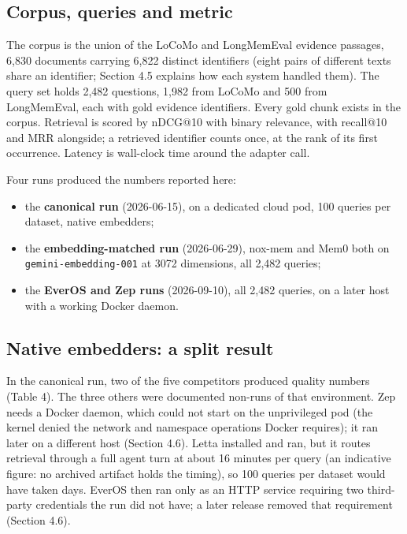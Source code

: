\documentclass[a4paper,fleqn]{cas-sc}
\providecommand{\tightlist}{\setlength{\itemsep}{0pt}\setlength{\parskip}{0pt}}
\begin{document}
\subsection{Corpus, queries and metric}

The corpus is the union of the LoCoMo and LongMemEval evidence passages, 6,830 documents carrying 6,822 distinct identifiers (eight pairs of different texts share an identifier; Section 4.5 explains how each system handled them). The query set holds 2,482 questions, 1,982 from LoCoMo and 500 from LongMemEval, each with gold evidence identifiers. Every gold chunk exists in the corpus. Retrieval is scored by nDCG@10 with binary relevance, with recall@10 and MRR alongside; a retrieved identifier counts once, at the rank of its first occurrence. Latency is wall-clock time around the adapter call.

Four runs produced the numbers reported here:

\begin{itemize}
\tightlist
\item
  the \textbf{canonical run} (2026-06-15), on a dedicated cloud pod, 100 queries per dataset, native embedders;
\item
  the \textbf{embedding-matched run} (2026-06-29), nox-mem and Mem0 both on \texttt{gemini-embedding-001} at 3072 dimensions, all 2,482 queries;
\item
  the \textbf{EverOS and Zep runs} (2026-09-10), all 2,482 queries, on a later host with a working Docker daemon.
\end{itemize}

\subsection{Native embedders: a split result}

In the canonical run, two of the five competitors produced quality numbers (Table 4). The three others were documented non-runs of that environment. Zep needs a Docker daemon, which could not start on the unprivileged pod (the kernel denied the network and namespace operations Docker requires); it ran later on a different host (Section 4.6). Letta installed and ran, but it routes retrieval through a full agent turn at about 16 minutes per query (an indicative figure: no archived artifact holds the timing), so 100 queries per dataset would have taken days. EverOS then ran only as an HTTP service requiring two third-party credentials the run did not have; a later release removed that requirement (Section 4.6).
\end{document}
